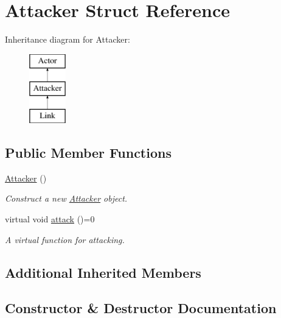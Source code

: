\hypertarget{structAttacker}{}\section{Attacker Struct Reference}
\label{structAttacker}
Inheritance diagram for Attacker\+:\begin{figure}[H]
\begin{center}
\leavevmode
\includegraphics[height=3.000000cm]{structAttacker}
\end{center}
\end{figure}
\subsection*{Public Member Functions}
\begin{DoxyCompactItemize}
\item 
\mbox{\hyperlink{structAttacker_a84fe68147e28f2e98d8eeecee9d3734c}{Attacker}} ()
\begin{DoxyCompactList}\small\item\em Construct a new \mbox{\hyperlink{structAttacker}{Attacker}} object. \end{DoxyCompactList}\item 
virtual void \mbox{\hyperlink{structAttacker_a4ce0aa08a102bd688d9a47322a830173}{attack}} ()=0
\begin{DoxyCompactList}\small\item\em A virtual function for attacking. \end{DoxyCompactList}\end{DoxyCompactItemize}
\subsection*{Additional Inherited Members}


\subsection{Constructor \& Destructor Documentation}
\mbox{\label{structAttacker_a84fe68147e28f2e98d8eeecee9d3734c}} 
